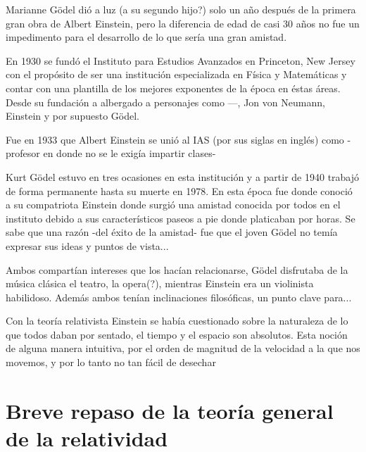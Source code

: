 \documentclass[11pt]{book}
\begin{document}
Marianne Gödel dió a luz (a su segundo hijo?) solo un año después de la primera gran obra de Albert Einstein, pero la diferencia de edad de casi 30 años no fue un impedimento para el desarrollo de lo que sería una gran amistad.

En 1930 se fundó el Instituto para Estudios Avanzados en Princeton, New Jersey con el propósito de ser una institución especializada en Física y Matemáticas %
y contar con una plantilla de los mejores exponentes de la época en éstas áreas. Desde su fundación a albergado a personajes como ---, Jon von Neumann, Einstein y por supuesto Gödel. %

Fue en 1933 que Albert Einstein se unió al IAS (por sus siglas en inglés) como -profesor en donde no se le exigía impartir clases- 

Kurt Gödel estuvo en tres ocasiones %
en esta institución y a partir de 1940 trabajó de forma permanente hasta su muerte en 1978. En esta época fue donde conoció a su compatriota Einstein donde surgió una amistad conocida por todos en el instituto debido a sus característicos paseos a pie donde platicaban por horas.%
Se sabe que una razón -del éxito de la amistad- fue que el joven Gödel no temía expresar sus ideas y puntos de vista...

Ambos compartían intereses que los hacían relacionarse, Gödel disfrutaba de la música clásica %
el teatro, la opera(?), mientras Einstein era un violinista habilidoso. Además ambos tenían inclinaciones filosóficas, un punto clave para...

Con la teoría relativista Einstein se había cuestionado sobre la naturaleza de lo que todos daban por sentado, el tiempo y el espacio son absolutos. Esta noción de alguna manera intuitiva, por el orden de magnitud de la velocidad a la que nos movemos,
 y por lo tanto no tan fácil de desechar 
 



\chapter{Breve repaso de la teoría general de la relatividad }



\end{document}
